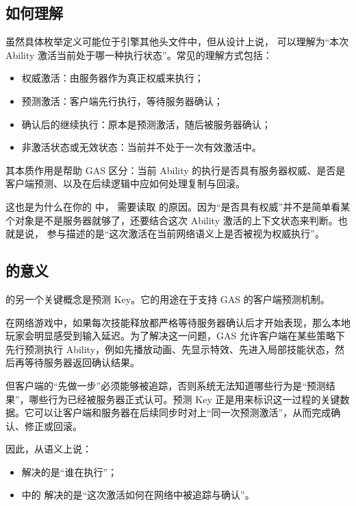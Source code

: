 \subsection{如何理解 }

虽然具体枚举定义可能位于引擎其他头文件中，但从设计上说， 可以理解为“本次 Ability 激活当前处于哪一种执行状态”。常见的理解方式包括：

\begin{itemize}
	\item 权威激活：由服务器作为真正权威来执行；
	\item 预测激活：客户端先行执行，等待服务器确认；
	\item 确认后的继续执行：原本是预测激活，随后被服务器确认；
	\item 非激活状态或无效状态：当前并不处于一次有效激活中。
\end{itemize}

其本质作用是帮助 GAS 区分：当前 Ability 的执行是否具有服务器权威、是否是客户端预测、以及在后续逻辑中应如何处理复制与回滚。

这也是为什么在你的  中， 需要读取  的原因。因为“是否具有权威”并不是简单看某个对象是不是服务器就够了，还要结合这次 Ability 激活的上下文状态来判断。也就是说， 参与描述的是“这次激活在当前网络语义上是否被视为权威执行”。

\subsection{ 的意义}

 的另一个关键概念是预测 Key。它的用途在于支持 GAS 的客户端预测机制。

在网络游戏中，如果每次技能释放都严格等待服务器确认后才开始表现，那么本地玩家会明显感受到输入延迟。为了解决这一问题，GAS 允许客户端在某些策略下先行预测执行 Ability，例如先播放动画、先显示特效、先进入局部技能状态，然后再等待服务器返回确认结果。

但客户端的“先做一步”必须能够被追踪，否则系统无法知道哪些行为是“预测结果”，哪些行为已经被服务器正式认可。预测 Key 正是用来标识这一过程的关键数据。它可以让客户端和服务器在后续同步时对上“同一次预测激活”，从而完成确认、修正或回滚。

因此，从语义上说：

\begin{itemize}
	\item {} 解决的是“谁在执行”；
	\item {} 中的  解决的是“这次激活如何在网络中被追踪与确认”。
\end{itemize}

